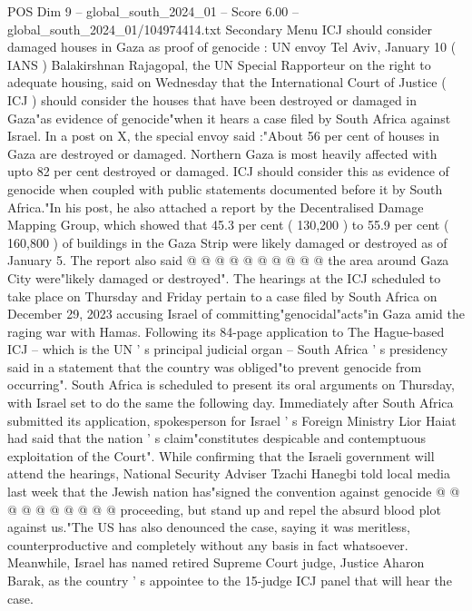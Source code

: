 \begin{textsample}{POS Dim 9 – global\_south\_2024\_01 – Score 6.00 – global\_south\_2024\_01/104974414.txt}  \label{ex:f9_pos_063}
Secondary Menu ICJ should consider damaged houses in Gaza as proof of genocide : UN envoy Tel Aviv, January 10 ( IANS ) Balakirshnan Rajagopal, the UN Special Rapporteur on the right to adequate housing, said on Wednesday that the International Court of Justice ( ICJ ) should consider the houses that have been destroyed or damaged in Gaza"as evidence of genocide"when it hears a case filed by South Africa against Israel.
In a post on X, the special envoy said :"About 56 per cent of houses in Gaza are destroyed or damaged.
Northern Gaza is most heavily affected with upto 82 per cent destroyed or damaged.
ICJ should consider this as evidence of genocide when coupled with public statements documented before it by South Africa."In his post, he also attached a report by the Decentralised Damage Mapping Group, which showed that 45.3 per cent ( 130,200 ) to 55.9 per cent ( 160,800 ) of buildings in the Gaza Strip were likely damaged or destroyed as of January 5.
The report also said @ @ @ @ @ @ @ @ @ @ the area around Gaza City were"likely damaged or destroyed".
The hearings at the ICJ scheduled to take place on Thursday and Friday pertain to a case filed by South Africa on December 29, 2023 accusing Israel of committing"genocidal"acts"in Gaza amid the raging war with Hamas.
Following its 84-page application to The Hague-based ICJ -- which is the UN ' s principal judicial organ -- South Africa ' s presidency said in a statement that the country was obliged"to prevent genocide from occurring".
South Africa is scheduled to present its oral arguments on Thursday, with Israel set to do the same the following day.
Immediately after South Africa submitted its application, spokesperson for Israel ' s Foreign Ministry Lior Haiat had said that the nation ' s claim"constitutes despicable and contemptuous exploitation of the Court".
While confirming that the Israeli government will attend the hearings, National Security Adviser Tzachi Hanegbi told local media last week that the Jewish nation has"signed the convention against genocide @ @ @ @ @ @ @ @ @ @ proceeding, but stand up and repel the absurd blood plot against us."The US has also denounced the case, saying it was meritless, counterproductive and completely without any basis in fact whatsoever.
Meanwhile, Israel has named retired Supreme Court judge, Justice Aharon Barak, as the country ' s appointee to the 15-judge ICJ panel that will hear the case.

\end{textsample}
